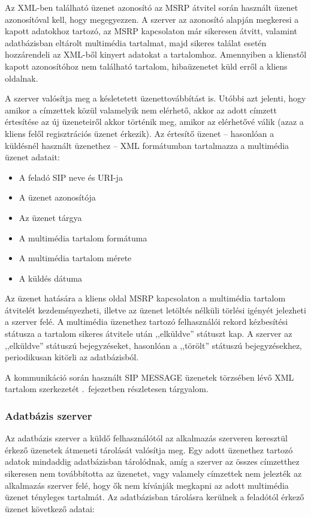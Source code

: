 Az XML-ben található üzenet azonosító az MSRP átvitel során használt üzenet azonosítóval kell, hogy megegyezzen. A szerver az azonosító alapján megkeresi a kapott adatokhoz tartozó, az MSRP kapcsolaton már sikeresen átvitt, valamint adatbázisban eltárolt multimédia tartalmat, majd sikeres találat esetén hozzárendeli az XML-ből kinyert adatokat a tartalomhoz. Amennyiben a klienstől kapott azonosítóhoz nem található tartalom, hibaüzenetet küld erről a kliens oldalnak.

A szerver valósítja meg a késletetett üzenettovábbítást is. Utóbbi azt jelenti, hogy amikor a címzettek közül valamelyik nem elérhető, akkor az adott címzett értesítése az új üzeneteiről akkor történik meg, amikor az elérhetővé válik (azaz a kliens felől regisztrációs üzenet érkezik). Az értesítő üzenet -- hasonlóan a küldésnél használt üzenethez -- XML formátumban tartalmazza a multimédia üzenet adatait:

\begin{itemize}\itemsep1pt
\item	A feladó SIP neve és URI-ja
\item A üzenet azonosítója
\item Az üzenet tárgya
\item A multimédia tartalom formátuma
\item A multimédia tartalom mérete
\item A küldés dátuma
\end{itemize}

Az üzenet hatására a kliens oldal MSRP kapcsolaton a multimédia tartalom átvitelét kezdeményezheti, illetve az üzenet letöltés nélküli törlési igényét jelezheti a szerver felé. A multimédia üzenethez tartozó felhasználói rekord kézbesítési státusza a tartalom sikeres átvitele után ,,elküldve'' státuszt kap. A szerver az ,,elküldve'' státuszú bejegyzéseket, hasonlóan a ,,törölt'' státuszú bejegyzésekhez, periodikusan kitörli az adatbázisból. 

A kommunikáció során használt SIP MESSAGE üzenetek törzsében lévő XML tartalom szerkezetét .~fejezetben részletesen tárgyalom.

\subsubsection{Adatbázis szerver}
\label{sec:dbserver}

Az adatbázis szerver a küldő felhasználótól az alkalmazás szerveren keresztül érkező üzenetek átmeneti tárolását valósítja meg. Egy adott üzenethez tartozó adatok mindaddig adatbázisban tárolódnak, amíg a szerver az összes címzetthez sikeresen nem továbbította az üzenetet, vagy valamely címzettek nem jelezték az alkalmazás szerver felé, hogy ők nem kívánják megkapni az adott multimédia üzenet tényleges tartalmát. Az adatbázisban tárolásra kerülnek a feladótól érkező üzenet következő adatai:

